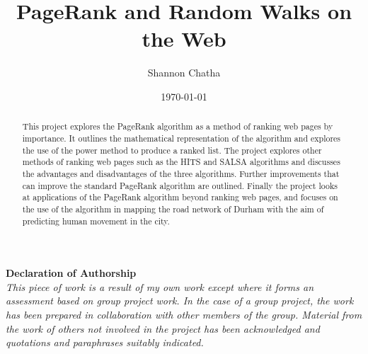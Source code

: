 \documentclass[11pt]{report}
\title{\textbf{PageRank and Random Walks on the Web}}
\author{Shannon Chatha}
\date{\today}
\begin{document}
\maketitle
\begin{abstract}
This project explores the PageRank algorithm as a method of ranking web pages by importance. It outlines the mathematical representation of the algorithm and explores the use of the power method to produce a ranked list. The project explores other methods of ranking web pages such as the HITS and SALSA algorithms and discusses the advantages and disadvantages of the three algorithms. Further improvements that can improve the standard PageRank algorithm are outlined. Finally the project looks at applications of the PageRank algorithm beyond ranking web pages, and focuses on the use of the algorithm in mapping the road network of Durham with the aim of predicting human movement in the city.
\end{abstract}
\newpage
\vspace*{\fill}
\begin{center}
\textbf{Declaration of Authorship}\\ 
\textit{This piece of work is a result of my own work except where it forms an assessment
based on group project work. In the case of a group project, the work
has been prepared in collaboration with other members of the group. Material
from the work of others not involved in the project has been acknowledged and
quotations and paraphrases suitably indicated.}
\end{center}
\vspace*{\fill}

\mbox{}
 

\end{document}
